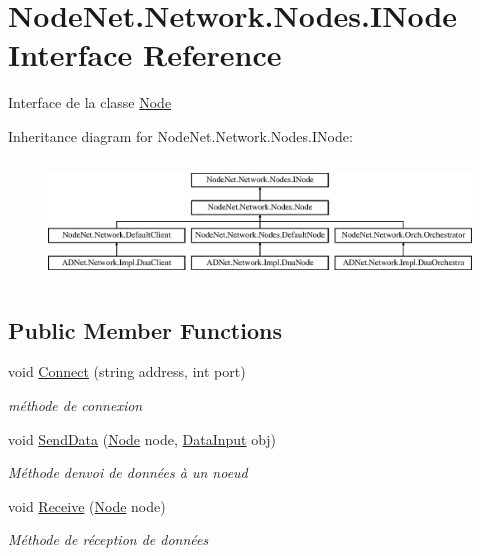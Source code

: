\hypertarget{interface_node_net_1_1_network_1_1_nodes_1_1_i_node}{}\section{Node\+Net.\+Network.\+Nodes.\+I\+Node Interface Reference}
\label{interface_node_net_1_1_network_1_1_nodes_1_1_i_node}


Interface de la classe \hyperlink{class_node_net_1_1_network_1_1_nodes_1_1_node}{Node}  


Inheritance diagram for Node\+Net.\+Network.\+Nodes.\+I\+Node\+:\begin{figure}[H]
\begin{center}
\leavevmode
\includegraphics[height=3.204578cm]{interface_node_net_1_1_network_1_1_nodes_1_1_i_node}
\end{center}
\end{figure}
\subsection*{Public Member Functions}
\begin{DoxyCompactItemize}
\item 
void \hyperlink{interface_node_net_1_1_network_1_1_nodes_1_1_i_node_a639c5f1dc82ca81b531ab7efb41ab404}{Connect} (string address, int port)
\begin{DoxyCompactList}\small\item\em méthode de connexion \end{DoxyCompactList}\item 
void \hyperlink{interface_node_net_1_1_network_1_1_nodes_1_1_i_node_ad0fd6197c2be78c4b17d3d02bb9f9a0b}{Send\+Data} (\hyperlink{class_node_net_1_1_network_1_1_nodes_1_1_node}{Node} node, \hyperlink{class_node_net_1_1_data_1_1_data_input}{Data\+Input} obj)
\begin{DoxyCompactList}\small\item\em Méthode d\textquotesingle{}envoi de données à un noeud \end{DoxyCompactList}\item 
void \hyperlink{interface_node_net_1_1_network_1_1_nodes_1_1_i_node_a8d325bc9a6e86d1cfd697692c603f7fb}{Receive} (\hyperlink{class_node_net_1_1_network_1_1_nodes_1_1_node}{Node} node)
\begin{DoxyCompactList}\small\item\em Méthode de réception de données \end{DoxyCompactList}\end{DoxyCompactItemize}



